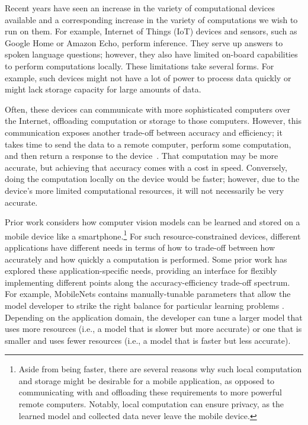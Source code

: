 \documentclass[sigplan,screen]{acmart}
\begin{document}
Recent years have seen an increase in the variety of computational devices available and a corresponding increase in the variety of computations we wish to run on them. For example, Internet of Things (IoT) devices and sensors, such as Google Home or Amazon Echo, perform inference. They serve up answers to spoken language questions; however, they also have limited on-board capabilities to perform computations locally. These limitations take several forms. For example, such devices might not have a lot of power to process data quickly or might lack storage capacity for large amounts of data.

Often, these devices can communicate with more sophisticated computers over the Internet, offloading computation or storage to those computers. However, this communication exposes another trade-off between accuracy and efficiency; it takes time to send the data to a remote computer, perform some computation, and then return a response to the device~\cite{birman2019cloud}. That computation may be more accurate, but achieving that accuracy comes with a cost in speed. Conversely, doing the computation locally on the device would be faster; however, due to the device's more limited computational resources, it will not necessarily be very accurate.

Prior work considers how computer vision models can be learned and stored on a mobile device like a smartphone.\footnote{Aside from being faster, there are several reasons why such local computation and storage might be desirable for a mobile application, as opposed to communicating with and offloading these requirements to more powerful remote computers. Notably, local computation can ensure privacy, as the learned model and collected data never leave the mobile device.} For such resource-constrained devices, different applications have different needs in terms of how to trade-off between how accurately and how quickly a computation is performed. Some prior work has explored these application-specific needs, providing an interface for flexibly implementing different points along the accuracy-efficiency trade-off spectrum. For example, MobileNets contains manually-tunable parameters that allow the model developer to strike the right balance for particular learning problems \cite{howard2017mobilenets}. Depending on the application domain, the developer can tune a larger model that uses more resources (i.e., a model that is slower but more accurate) or one that is smaller and uses fewer resources (i.e., a model that is faster but less accurate).
\end{document}
